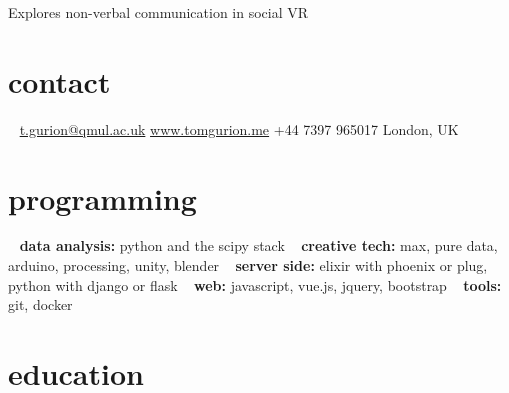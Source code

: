 \documentclass[]{friggeri-cv}
\begin{document}
       {Explores non-verbal communication in social VR}



\begin{aside}
\section{contact}
~
\href{mailto:t.gurion@qmul.ac.uk}{t.gurion@qmul.ac.uk}
\href{http://www.tomgurion.me}{www.tomgurion.me}
+44 7397 965017
London, UK
~
\section{programming}
~
\textbf{data analysis:} python and the scipy stack
~
\textbf{creative tech:} max, pure data, arduino, processing, unity, blender
~
\textbf{server side:} elixir with phoenix or plug, python with django or flask
~
\textbf{web:} javascript, vue.js, jquery, bootstrap
~
\textbf{tools:} git, docker
\end{aside}



\section{education}
\end{document}

